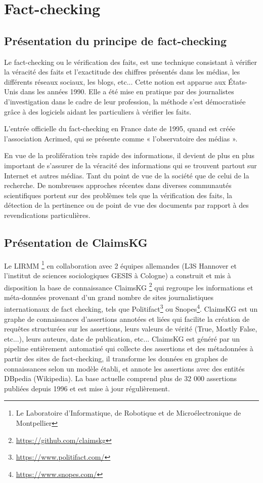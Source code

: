 \documentclass[oneside,13pt,a4paper]{report}
\begin{document}
\section{Fact-checking}

\subsection{Présentation du principe de fact-checking}

Le fact-checking ou le vérification des faits, est une technique consistant à vérifier la véracité des faits et l'exactitude des chiffres présentés dans les médias, les différents réseaux sociaux, les blogs, etc...
Cette notion est apparue aux États-Unis dans les années 1990. Elle a été mise en pratique par des journalistes d'investigation dans le cadre de leur profession, la méthode s'est démocratisée grâce à des logiciels aidant les particuliers à vérifier les faits.

L'entrée officielle du fact-checking en France date de 1995, quand est créée l'association Acrimed, qui se présente comme « l'observatoire des médias ».

En vue de la prolifération très rapide des informations, il devient de plus en plus important de s'assurer de la véracité des informations qui se trouvent partout sur Internet et autres médias. Tant du point de vue de la société que de celui de la recherche. De nombreuses approches récentes dans diverses communautés scientifiques portent sur des problèmes tels que la vérification des faits, la détection de la pertinence ou de point de vue des documents par rapport à des revendications particulières.

\subsection{Présentation de ClaimsKG}


Le LIRMM \footnote{Le Laboratoire d’Informatique, de Robotique et de Microélectronique de Montpellier} en collaboration avec 2 équipes allemandes (L3S Hannover et l’institut de sciences sociologiques GESIS à Cologne) a construit et mis à disposition la base de connaissance ClaimsKG \footnote{\url{https://github.com/claimskg}} qui regroupe les informations et méta-données provenant d’un grand nombre de sites journalistiques internationaux de fact checking, tels que Politifact\footnote{\url{https://www.politifact.com/}} ou Snopes\footnote{\url{https://www.snopes.com/}}. ClaimsKG est un graphe de connaissances d’assertions annotées et liées qui facilite la création de requêtes structurées sur les assertions, leurs valeurs de vérité (True, Mostly False, etc...), leurs auteurs, date de publication, etc... ClaimsKG est généré par un pipeline entièrement automatisé qui collecte des assertions et des métadonnées à partir des sites de fact-checking, il transforme les données en graphes de connaissances selon un modèle établi, et annote les assertions avec des entités DBpedia (Wikipedia). La base actuelle comprend plus de 32 000 assertions publiées depuis 1996 et est mise à jour régulièrement.
\end{document}
